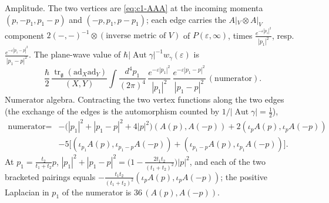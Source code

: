 \begin{example}
\label{ex:c4-gauge}
Amplitude. The two vertices are \eqref{eq:c1-AAA} at the incoming momenta $(p,-p_1,p_1-p)$ and $(-p,p_1,p-p_1)$; each edge carries the $A|_V\otimes A|_V$ component $2(-,-)^{-1}\otimes(\text{inverse metric of }V)$ of $P(\varepsilon,\infty)$, times $\frac{e^{-\varepsilon|p_1|^2}}{|p_1|^2}$, resp. $\frac{e^{-\varepsilon|p_1-p|^2}}{|p_1-p|^2}$. The plane-wave value of $\hbar|\operatorname{Aut}\gamma|^{-1}w_\gamma(\varepsilon)$ is
\[
\frac\hbar2\,\frac{\operatorname{tr}_{\mathfrak g}(\mathrm{ad}_X\mathrm{ad}_Y)}{(X,Y)}\int\frac{d^4p_1}{(2\pi)^4}\,\frac{e^{-\varepsilon|p_1|^2}}{|p_1|^2}\,\frac{e^{-\varepsilon|p_1-p|^2}}{|p_1-p|^2}\,(\text{numerator}).
\]
Numerator algebra. Contracting the two vertex functions along the two edges (the exchange of the edges is the automorphism counted by $1/|\operatorname{Aut}\gamma|=\tfrac12$),
\[
\begin{aligned}
\text{numerator}={}&-\big(|p_1|^2+|p_1-p|^2+4|p|^2\big)(A(p),A(-p))+2(\iota_pA(p),\iota_pA(-p))\\
&-5\big[(\iota_{p_1}A(p),\iota_{p_1-p}A(-p))+(\iota_{p_1-p}A(p),\iota_{p_1}A(-p))\big].
\end{aligned}
\]
At $p_1=\frac{t_2}{t_1+t_2}p$, $|p_1|^2+|p_1-p|^2=\big(1-\frac{2t_1t_2}{(t_1+t_2)^2}\big)|p|^2$, and each of the two bracketed pairings equals $-\frac{t_1t_2}{(t_1+t_2)^2}(\iota_pA(p),\iota_pA(-p))$; the positive Laplacian in $p_1$ of the numerator is $36\,(A(p),A(-p))$.


\end{example}
